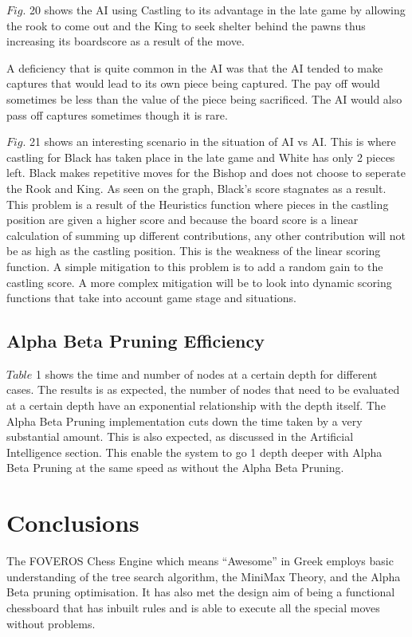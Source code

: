 \documentclass[11pt,a4paper]{article}
\begin{document}
	$Fig.$ 20 shows the AI using Castling to its advantage in the late game by allowing the rook to come out and the King to seek shelter behind the pawns thus increasing its boardscore as a result of the move. 

	A deficiency that is quite common in the AI was that the AI tended to make captures that would lead to its own piece being captured. The pay off would sometimes be less than the value of the piece being sacrificed. The AI would also pass off captures sometimes though it is rare.

	$Fig.$ 21 shows an interesting scenario in the situation of AI vs AI. This is where castling for Black has taken place in the late game and White has only 2 pieces left. Black makes repetitive moves for the Bishop and does not choose to seperate the Rook and King. As seen on the graph, Black's score stagnates as a result. This problem is a result of the Heuristics function where pieces in the castling position are given a higher score and because the board score is a linear calculation of summing up different contributions, any other contribution will not be as high as the castling position. This is the weakness of the linear scoring function. A simple mitigation to this problem is to add a random gain to the castling score. A more complex mitigation will be to look into dynamic scoring functions that take into account game stage and situations.

\subsection{Alpha Beta Pruning Efficiency}
\indent\indent $Table$ 1 shows the time and number of nodes at a certain depth for different cases. The results is as expected, the number of nodes that need to be evaluated at a certain depth have an exponential relationship with the depth itself. The Alpha Beta Pruning implementation cuts down the time taken by a very substantial amount. This is also expected, as discussed in the Artificial Intelligence section. This enable the system to go 1 depth deeper with Alpha Beta Pruning at the same speed as without the Alpha Beta Pruning.


\newpage
\section{Conclusions}

\indent\indent The FOVEROS Chess Engine which means “Awesome” in Greek employs basic understanding of the tree search algorithm, the MiniMax Theory, and the Alpha Beta pruning optimisation. It has also met the design aim of being a functional chessboard that has inbuilt rules and is able to execute all the special moves without problems.
\end{document}
